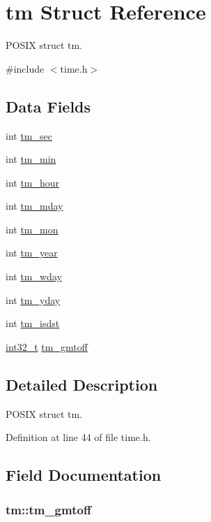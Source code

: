 \hypertarget{structtm}{\section{tm Struct Reference}
\label{structtm}
}


P\-O\-S\-I\-X struct tm.  




{\ttfamily \#include $<$time.\-h$>$}

\subsection*{Data Fields}
\begin{DoxyCompactItemize}
\item 
int \hyperlink{structtm_a4d098a9a5c03a00b2ee61e10851de81e}{tm\-\_\-sec}
\item 
int \hyperlink{structtm_af414eb7c86cc3099595211eee4d4211b}{tm\-\_\-min}
\item 
int \hyperlink{structtm_a3e7ca4e37f1abcaf56b8a916c38eb9fe}{tm\-\_\-hour}
\item 
int \hyperlink{structtm_ab8d8904bad43b0c8b96e61941c5b5310}{tm\-\_\-mday}
\item 
int \hyperlink{structtm_a112ac36fa2f593777138a417cf031e17}{tm\-\_\-mon}
\item 
int \hyperlink{structtm_a33adf78fd6476b2120ce3b9c4a852053}{tm\-\_\-year}
\item 
int \hyperlink{structtm_afe81a8c46f1c693c43f259b288859f4f}{tm\-\_\-wday}
\item 
int \hyperlink{structtm_a93a0ba77cc23796df84405dcbcc57eb1}{tm\-\_\-yday}
\item 
int \hyperlink{structtm_a5645ca0580c8ab2c24f6c2965d9c9f9c}{tm\-\_\-isdst}
\item 
\hyperlink{earth2wireframe_8c_a32f2e37ee053cf2ce8ca28d1f74630e5}{int32\-\_\-t} \hyperlink{structtm_a6b7d1fb16f21197ea027e364e2812c3d}{tm\-\_\-gmtoff}
\end{DoxyCompactItemize}


\subsection{Detailed Description}
P\-O\-S\-I\-X struct tm. 

Definition at line 44 of file time.\-h.



\subsection{Field Documentation}
\hypertarget{structtm_a6b7d1fb16f21197ea027e364e2812c3d}{
\subsubsection[{tm\-\_\-gmtoff}]{ tm\-::tm\-\_\-gmtoff}}\label{structtm_a6b7d1fb16f21197ea027e364e2812c3d}


